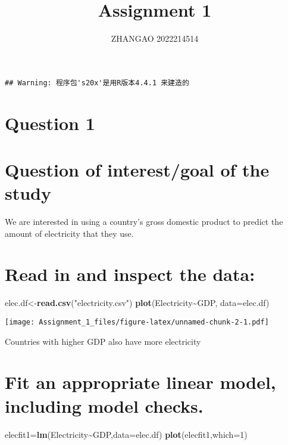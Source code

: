 \documentclass[
]{article}
\title{Assignment 1}
\author{ZHANGAO 2022214514}
\date{}
\newenvironment{Shaded}{\begin{snugshade}}{\end{snugshade}}
\newcommand{\AttributeTok}[1]{\textcolor[rgb]{0.13,0.29,0.53}{#1}}
\newcommand{\DecValTok}[1]{\textcolor[rgb]{0.00,0.00,0.81}{#1}}
\newcommand{\FunctionTok}[1]{\textcolor[rgb]{0.13,0.29,0.53}{\textbf{#1}}}
\newcommand{\NormalTok}[1]{#1}
\newcommand{\OtherTok}[1]{\textcolor[rgb]{0.56,0.35,0.01}{#1}}
\newcommand{\SpecialCharTok}[1]{\textcolor[rgb]{0.81,0.36,0.00}{\textbf{#1}}}
\newcommand{\StringTok}[1]{\textcolor[rgb]{0.31,0.60,0.02}{#1}}
\begin{document}
\maketitle

\begin{verbatim}
## Warning: 程序包's20x'是用R版本4.4.1 来建造的
\end{verbatim}

\section{Question 1}\label{question-1}

\section{Question of interest/goal of the
study}\label{question-of-interestgoal-of-the-study}

We are interested in using a country's gross domestic product to predict
the amount of electricity that they use.

\section{Read in and inspect the
data:}\label{read-in-and-inspect-the-data}

\begin{Shaded}
\begin{Highlighting}[]
\NormalTok{elec.df}\OtherTok{\textless{}{-}}\FunctionTok{read.csv}\NormalTok{(}\StringTok{"electricity.csv"}\NormalTok{)}
\FunctionTok{plot}\NormalTok{(Electricity}\SpecialCharTok{\textasciitilde{}}\NormalTok{GDP, }\AttributeTok{data=}\NormalTok{elec.df)}
\end{Highlighting}
\end{Shaded}

\texttt{[image: Assignment\_1\_files/figure-latex/unnamed-chunk-2-1.pdf]}

Countries with higher GDP also have more electricity

\section{Fit an appropriate linear model, including model
checks.}\label{fit-an-appropriate-linear-model-including-model-checks.}

\begin{Shaded}
\begin{Highlighting}[]
\NormalTok{elecfit1}\OtherTok{=}\FunctionTok{lm}\NormalTok{(Electricity}\SpecialCharTok{\textasciitilde{}}\NormalTok{GDP,}\AttributeTok{data=}\NormalTok{elec.df)}
\FunctionTok{plot}\NormalTok{(elecfit1,}\AttributeTok{which=}\DecValTok{1}\NormalTok{)}
\end{Highlighting}
\end{Shaded}
\end{document}
